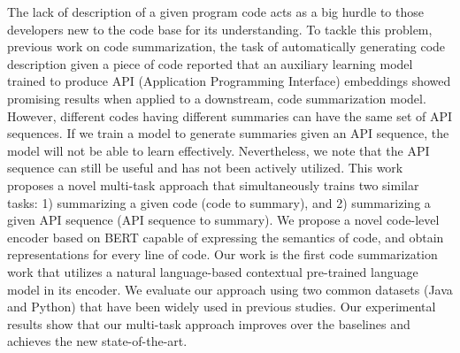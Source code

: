 The lack of description of a given program code acts as a big hurdle to those developers new to the code base for its understanding. To tackle this problem, previous work on code summarization, the task of automatically generating code description given a piece of code reported that an auxiliary learning model trained to produce API (Application Programming Interface) embeddings showed promising results when applied to a downstream, code summarization model. However, different codes having different summaries can have the same set of API sequences. If we train a model to generate summaries given an API sequence, the model will not be able to learn effectively. Nevertheless, we note that the API sequence can still be useful and has not been actively utilized. This work proposes a novel multi-task approach that simultaneously trains two similar tasks: 1) summarizing a given code (code to summary), and 2) summarizing a given API sequence (API sequence to summary). We propose a novel code-level encoder based on BERT capable of expressing the semantics of code, and obtain representations for every line of code. Our work is the first code summarization work that utilizes a natural language-based contextual pre-trained language model in its encoder. We evaluate our approach using two common datasets (Java and Python) that have been widely used in previous studies. Our experimental results show that our multi-task approach improves over the baselines and achieves the new state-of-the-art.
